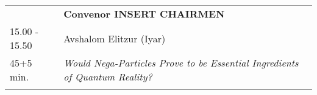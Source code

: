 \begin{longtable}{p{3cm}p{13cm}}
&\hfill {\bf Convenor INSERT CHAIRMEN }\\ 
15.00 - 15.50 & Avshalom Elitzur (Iyar)\\ 
45+5 min. & {\it Would Nega-Particles Prove to be Essential Ingredients of Quantum Reality?}\\ 
 & \\ 
\end{longtable}

